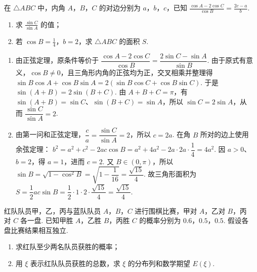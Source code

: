 \begin{problem}
在 \(\triangle ABC\) 中，内角 \(A\)，\(B\)，\(C\) 的对边分别为 \(a\)，\(b\)，\(c\)，已知 \(\frac{\cos A - 2 \cos C}{\cos B} = \frac{2c - a}{b}\).
\begin{enumerate}
\item 求 \(\frac{\sin C}{\sin A}\) 的值；
\item 若 \(\cos B = \frac{1}{4}\)，\(b = 2\)，求 \(\triangle ABC\) 的面积 \(S\).
\end{enumerate}
\end{problem}

\begin{solution}
\begin{enumerate}
\item 由正弦定理，原条件等价于
\(\dfrac{\cos A-2\cos C}{\cos B}=\dfrac{2\sin C-\sin A}{\sin B}\). 由于原式有意义，\(\cos B\ne0\)，且三角形内角的正弦均为正，交叉相乘并整理得
\(\sin B\cos A+\cos B\sin A=2(\sin B\cos C+\cos B\sin C)\).
于是 \(\sin(A+B)=2\sin(B+C)\). 由 \(A+B+C=\pi\)，有
\(\sin(A+B)=\sin C\)、\(\sin(B+C)=\sin A\)，所以 \(\sin C=2\sin A\)，从而
\(\dfrac{\sin C}{\sin A}=2\).
\item 由第一问和正弦定理，\(\dfrac ca=\dfrac{\sin C}{\sin A}=2\)，所以 \(c=2a\). 在角 \(B\) 所对的边上使用余弦定理：
\(b^2=a^2+c^2-2ac\cos B=a^2+4a^2-2a\cdot2a\cdot\dfrac14=4a^2\).
因 \(a>0\)、\(b=2\)，得 \(a=1\)，进而 \(c=2\). 又 \(B\in(0,\pi)\)，所以
\(\sin B=\sqrt{1-\cos^2B}=\sqrt{1-\dfrac1{16}}=\dfrac{\sqrt{15}}4\).
故三角形面积为
\(S=\dfrac12ac\sin B=\dfrac12\cdot1\cdot2\cdot\dfrac{\sqrt{15}}4=\dfrac{\sqrt{15}}4\).
\end{enumerate}
\end{solution}

\begin{problem}
红队队员甲，乙，丙与蓝队队员 \(A\)，\(B\)，\(C\) 进行围棋比赛，甲对 \(A\)，乙对 \(B\)，丙对 \(C\) 各一盘. 已知甲胜 \(A\)，乙胜 \(B\)，丙胜 \(C\) 的概率分别为 \(0.6\)，\(0.5\)，\(0.5\). 假设各盘比赛结果相互独立.
\begin{enumerate}
\item 求红队至少两名队员获胜的概率；
\item 用 \(\xi\) 表示红队队员获胜的总数，求 \(\xi\) 的分布列和数学期望 \(E(\xi)\).
\end{enumerate}
\end{problem}

